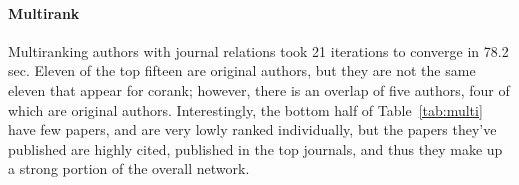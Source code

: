     \begin{table}[h]
    \caption{Top Authors by Corank}
    \label{tab:author_corank}
    \end{table}



\paragraph{Multirank}
Multiranking authors with journal relations took 21 iterations to converge in 78.2 sec. Eleven of the top fifteen are original authors, but they are not the same eleven that appear for corank; however, there is an overlap of five authors, four of which are original authors. Interestingly, the bottom half of Table~\ref{tab:multi} have few papers, and are very lowly ranked individually, but the papers they've published are highly cited, published in the top journals, and thus they make up a strong portion of the overall network. 

